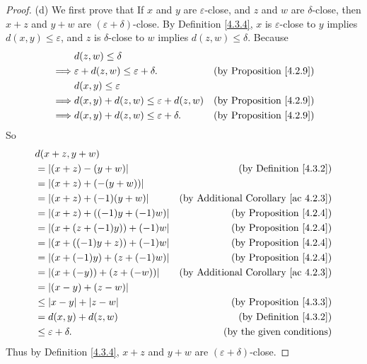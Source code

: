 \begin{proof}{(d)}
    We first prove that If \(x\) and \(y\) are \(\varepsilon\)-close, and \(z\) and \(w\) are \(\delta\)-close, then \(x + z\) and \(y + w\) are \((\varepsilon + \delta)\)-close.
    By Definition \ref{4.3.4}, \(x\) is \(\varepsilon\)-close to \(y\) implies \(d(x, y) \leq \varepsilon\), and \(z\) is \(\delta\)-close to \(w\) implies \(d(z, w) \leq \delta\).
    Because
    \begin{align*}
                 & d(z, w) \leq \delta                                                                    \\
        \implies & \varepsilon + d(z, w) \leq \varepsilon + \delta. & \text{(by Proposition \ref{4.2.9})} \\
                 & d(x, y) \leq \varepsilon                                                               \\
        \implies & d(x, y) + d(z, w) \leq \varepsilon + d(z, w)     & \text{(by Proposition \ref{4.2.9})} \\
        \implies & d(x, y) + d(z, w) \leq \varepsilon + \delta.     & \text{(by Proposition \ref{4.2.9})}
    \end{align*}
    So
    \begin{align*}
         & d(x + z, y + w)                                                                      \\
         & = \abs*{(x + z) - (y + w)}         & \text{(by Definition \ref{4.3.2})}              \\
         & = \abs*{(x + z) + (-(y + w))}                                                        \\
         & = \abs*{(x + z) + (-1)(y + w)}     & \text{(by Additional Corollary \ref{ac 4.2.3})} \\
         & = \abs*{(x + z) + ((-1)y + (-1)w)} & \text{(by Proposition \ref{4.2.4})}             \\
         & = \abs*{(x + (z + (-1)y)) + (-1)w} & \text{(by Proposition \ref{4.2.4})}             \\
         & = \abs*{(x + ((-1)y + z)) + (-1)w} & \text{(by Proposition \ref{4.2.4})}             \\
         & = \abs*{(x + (-1)y) + (z + (-1)w)} & \text{(by Proposition \ref{4.2.4})}             \\
         & = \abs*{(x + (-y)) + (z + (-w))}   & \text{(by Additional Corollary \ref{ac 4.2.3})} \\
         & = \abs*{(x - y) + (z - w)}                                                           \\
         & \leq \abs*{x - y} + \abs*{z - w}   & \text{(by Proposition \ref{4.3.3})}             \\
         & = d(x, y) + d(z, w)                & \text{(by Definition \ref{4.3.2})}              \\
         & \leq \varepsilon + \delta.         & \text{(by the given conditions)}
    \end{align*}
    Thus by Definition \ref{4.3.4}, \(x + z\) and \(y + w\) are \((\varepsilon + \delta)\)-close.


\end{proof}

